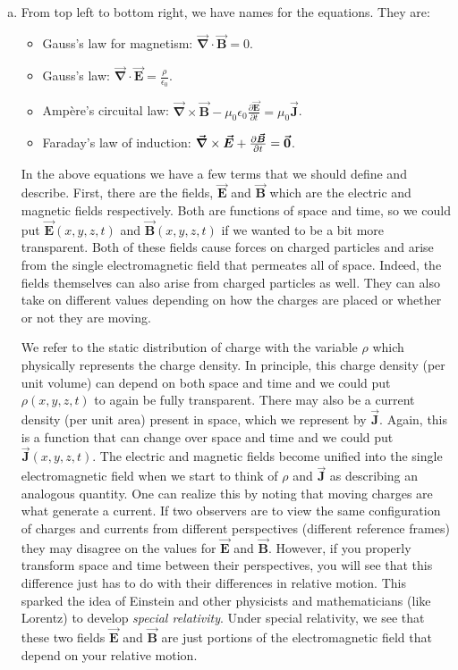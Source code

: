 \documentclass[12pt]{article} %
\newcommand{\vecfieldB}{\boldsymbol{\vec{B}}}
\newcommand{\vecfieldE}{\boldsymbol{\vec{E}}}
\newcommand{\vecfieldJ}{\boldsymbol{\vec{J}}}
\newcommand{\grad}{\boldsymbol{\vec{\nabla}}}
\begin{document}
\begin{solution}~
\begin{enumerate}[(a)]
    \item From top left to bottom right, we have names for the equations.  They are:
    \begin{itemize}
        \item Gauss's law for magnetism: $\grad \cdot \vecfieldB = 0$.
        \item Gauss's law: $\grad \cdot \vecfieldE = \frac{\rho}{\epsilon_0}$.
        \item Amp\`ere's circuital law: $\grad \times \vecfieldB -\mu_0 \epsilon_0\frac{\partial \vecfieldE}{\partial t}=\mu_0 \vecfieldJ$.
        \item Faraday's law of induction: $\grad \times \vecfieldE + \frac{\partial \vecfieldB}{\partial t} = \zerovec$.
    \end{itemize}
    
    In the above equations we have a few terms that we should define and describe.  First, there are the fields, $\vecfieldE$ and $\vecfieldB$ which are the electric and magnetic fields respectively.  Both are functions of space and time, so we could put $\vecfieldE(x,y,z,t)$ and $\vecfieldB(x,y,z,t)$ if we wanted to be a bit more transparent.  Both of these fields cause forces on charged particles and arise from the single electromagnetic field that permeates all of space.  Indeed, the fields themselves can also arise from charged particles as well.  They can also take on different values depending on how the charges are placed or whether or not they are moving.
    
    We refer to the static distribution of charge with the variable $\rho$ which physically represents the charge density.  In principle, this charge density (per unit volume) can depend on both space and time and we could put $\rho(x,y,z,t)$ to again be fully transparent.  There may also be a current density (per unit area) present in space, which we represent by $\vecfieldJ$. Again, this is a function that can change over space and time and we could put $\vecfieldJ(x,y,z,t)$.  The electric and magnetic fields become unified into the single electromagnetic field when we start to think of $\rho$ and $\vecfieldJ$ as describing an analogous quantity. One can realize this by noting that moving charges are what generate a current.  If two observers are to view the same configuration of charges and currents from different perspectives (different reference frames) they may disagree on the values for $\vecfieldE$ and $\vecfieldB$.  However, if you properly transform space and time between their perspectives, you will see that this difference just has to do with their differences in relative motion.  This sparked the idea of Einstein and other physicists and mathematicians (like Lorentz) to develop \emph{special relativity}.  Under special relativity, we see that these two fields $\vecfieldE$ and $\vecfieldB$ are just portions of the electromagnetic field that depend on your relative motion.
    

\end{enumerate}
\end{solution}
\end{document}
